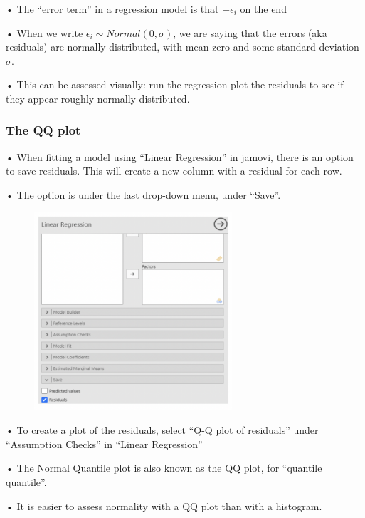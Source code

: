 \documentclass[
  letterpaper,
  DIV=11,
  numbers=noendperiod]{scrreprt}
\begin{document}
• The ``error term'' in a regression model is that \(+ \epsilon_i\) on
the end

• When we write \(\epsilon_i \sim Normal(0, \sigma)\), we are saying
that the errors (aka residuals) are normally distributed, with mean zero
and some standard deviation \(\sigma\).

• This can be assessed visually: run the regression plot the residuals
to see if they appear roughly normally distributed.

\hypertarget{the-qq-plot}{%
\subsubsection{The QQ plot}\label{the-qq-plot}}

• When fitting a model using ``Linear Regression'' in jamovi, there is
an option to save residuals. This will create a new column with a
residual for each row.

• The option is under the last drop-down menu, under ``Save''.

\begin{figure}

{\centering \includegraphics[width=2.89583in,height=\textheight]{images/mod4_pt1_6.png}

}

\end{figure}

• To create a plot of the residuals, select ``Q-Q plot of residuals''
under ``Assumption Checks'' in ``Linear Regression''

• The Normal Quantile plot is also known as the QQ plot, for ``quantile
quantile''.

• It is easier to assess normality with a QQ plot than with a histogram.
\end{document}
